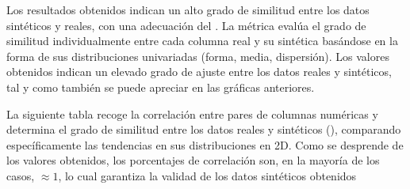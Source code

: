 \documentclass[a4paper,10pt,spanish]{jupyterBook}
\begin{document}
\sphinxAtStartPar
Los resultados obtenidos indican un alto grado de similitud entre los datos sintéticos y reales, con una adecuación del . La métrica  evalúa el grado de similitud individualmente entre cada columna real y su sintética basándose en la forma de sus distribuciones univariadas (forma, media, dispersión). Los valores obtenidos indican un elevado grado de ajuste entre los datos reales y sintéticos, tal y como también se puede apreciar en las gráficas anteriores.

\sphinxAtStartPar
La siguiente tabla recoge la correlación entre pares de columnas numéricas y determina el grado de similitud entre los datos reales y sintéticos (), comparando específicamente las tendencias en sus distribuciones en 2D. Como se desprende de los valores obtenidos, los porcentajes de correlación son, en la mayoría de los casos, \(\approx 1\), lo cual garantiza la validad de los datos sintéticos obtenidos
\end{document}
